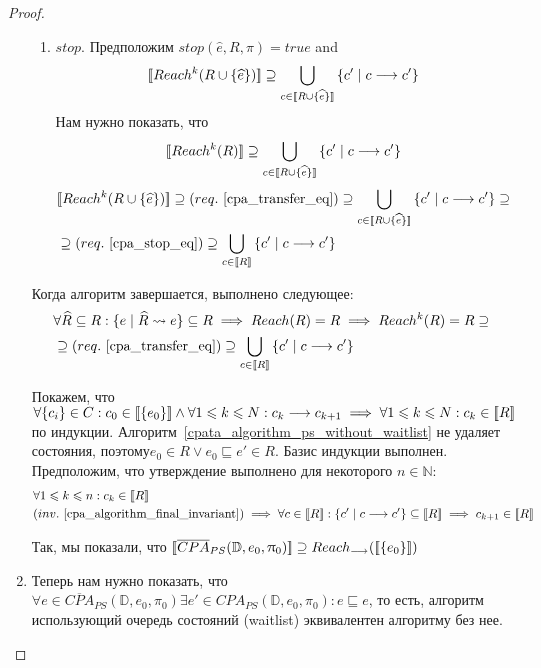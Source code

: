 \begin{proof}
\begin{enumerate}
\begin{enumerate}
\item $stop$. Предположим $stop(\widehat{e}, R, \pi) = true$ and $$[\![ Reach^k(R \cup \{\widehat{e}\}) ]\!] \supseteq \bigcup_{c \in [\![ R \cup \{\widehat{e}\} ]\!]}{\{c' \mid c \longrightarrow c'\}}$$
Нам нужно показать, что $$[\![ Reach^k(R) ]\!] \supseteq \bigcup_{c \in [\![ R \cup \{\widehat{e}\} ]\!]}{\{c' \mid c \longrightarrow c'\}}$$
\begin{align}
& [\![ Reach^k(R \cup \{\widehat{e}\}) ]\!] \supseteq (req.~\ref{cpa_transfer_eq}) \supseteq \bigcup_{c \in [\![ R \cup \{\widehat{e}\} ]\!]}{\{c' \mid c \longrightarrow c'\}} \supseteq \nonumber \\
& \supseteq (req.~\ref{cpa_stop_eq}) \supseteq \bigcup_{c \in [\![ R ]\!]}{\{c' \mid c \longrightarrow c'\}} \nonumber
\end{align}

\end{enumerate}

Когда алгоритм завершается, выполнено следующее:
\begin{equation}
\label{cpa_algorithm_final_invariant}
\begin{aligned}
& \forall \widehat{R} \subseteq R: \{e \mid \widehat{R} \leadsto e\} \subseteq R \implies Reach(R) = R \implies Reach^k(R) = R \supseteq \\
& \supseteq (req.~\ref{cpa_transfer_eq}) \supseteq \bigcup_{c \in [\![ R ]\!]}{\{c' \mid c \longrightarrow c'\}}
\end{aligned}
\end{equation}

Покажем, что $\forall \{c_i\} \in C: c_0 \in [\![ \{e_0\} ]\!] \land \forall 1 \leqslant k \leqslant N: c_{k} \longrightarrow c_{k+1} \implies \forall 1 \leqslant k \leqslant N: c_k \in [\![ R ]\!]$ по индукции.
Алгоритм~\ref{cpata_algorithm_ps_without_waitlist} не удаляет состояния, поэтому$e_0 \in R \lor e_0 \sqsubseteq e' \in R$. Базис индукции выполнен.
Предположим, что утверждение выполнено для некоторого $n \in \mathbb{N}$:
\begin{align}
& \forall 1 \leq k \leq n: c_k \in \conc{R} \nonumber \\ 
& (inv.~\ref{cpa_algorithm_final_invariant}) \implies \forall c \in \conc{R}: \{c' \mid c \tcarrow c'\} \subseteq \conc{R} \implies c_{k+1} \in \conc{R} \nonumber
\end{align}

Так, мы показали, что $[\![ \overline{CPA}_{PS}(\mathbb{D}, e_0, \uppi_0) ]\!] \supseteq Reach_{\longrightarrow}([\![ \{e_0\} ]\!])$

\item Теперь нам нужно показать, что $\forall e \in \overline{CPA}_{PS}(\mathbb{D}, e_0, \pi_0) \exists e' \in CPA_{PS}(\mathbb{D}, e_0, \pi_0): e \sqsubseteq e$, то есть, алгоритм использующий очередь состояний (waitlist) эквивалентен алгоритму без нее.


\end{enumerate}
\end{proof}
